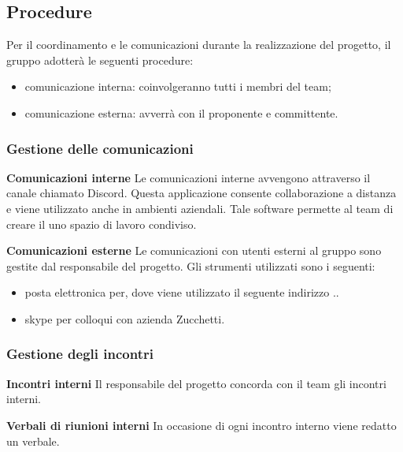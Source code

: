 \subsection{Procedure}
Per il coordinamento e le comunicazioni durante la realizzazione del progetto, il gruppo adotterà le seguenti procedure: 
\begin{itemize}
\item{comunicazione interna}: coinvolgeranno tutti i membri del team;
\item{comunicazione esterna}: avverrà con il proponente e committente.
\end{itemize}

\subsubsection{Gestione delle comunicazioni}
\textbf{Comunicazioni interne} \newline \newline
Le comunicazioni interne avvengono attraverso il canale chiamato Discord. Questa applicazione consente collaborazione a distanza e viene utilizzato anche in ambienti aziendali. Tale software permette al team di creare il uno spazio di lavoro condiviso.

\textbf{Comunicazioni esterne} \newline \newline
Le comunicazioni con utenti esterni al gruppo sono gestite dal responsabile del progetto. Gli strumenti utilizzati sono i seguenti: 
\begin{itemize}
\item posta elettronica per, dove viene utilizzato il seguente indirizzo ..
\item skype per colloqui con azienda Zucchetti.
\end{itemize}

\subsubsection{Gestione degli incontri}
\textbf{Incontri interni} \newline \newline
Il responsabile del progetto concorda con il team gli incontri interni.\newline \newline

\textbf{Verbali di riunioni interni} \newline \newline
In occasione di ogni incontro interno viene redatto un verbale.
\newline \newline

